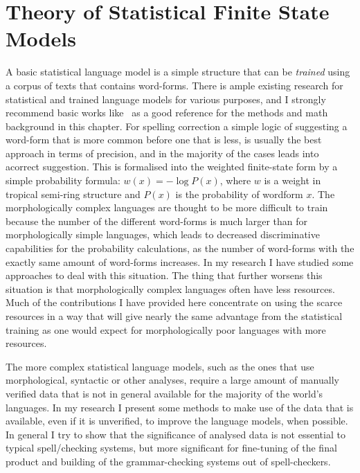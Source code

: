 \documentclass[officiallayout]{unihelcompling}
\begin{document}
\section{Theory of Statistical Finite State Models}
\label{sec:statistical}

A basic statistical language model is a simple structure that can be
\emph{trained} using a corpus of texts that contains word-forms. There is ample
existing research for statistical and trained language models for various
purposes, and I strongly recommend basic works
like~\citet{manning1999foundations} as a good reference for the methods and
math background in this chapter.  For spelling correction a simple logic of
suggesting a word-form that is more common before one that is less, is usually
the best approach in terms of precision, and in the majority of the cases leads
into acorrect suggestion. This is formalised into the weighted finite-state
form by a simple probability formula: $w(x) = -\log P(x)$, where $w$ is a
weight in tropical semi-ring structure and $P(x)$ is the probability of
wordform $x$.  The morphologically complex languages are thought to be more
difficult to train because the number of the different word-forms is much
larger than for morphologically simple languages, which leads to decreased
discriminative capabilities for the probability calculations, as the number of
word-forms with the exactly same amount of word-forms increases. In my research
I have studied some approaches to deal with this situation. The thing that
further worsens this situation is that morphologically complex languages often
have less resources.  Much of the contributions I have provided here
concentrate on using the scarce resources in a way that will give nearly the
same advantage from the statistical training as one would expect for
morphologically poor languages with more resources.

The more complex statistical language models, such as the ones that use
morphological, syntactic or other analyses, require a large amount of manually
verified data that is not in general available for the majority of the world's
languages. In my research I present some methods to make use of the data that
is available, even if it is unverified, to improve the language models, when
possible. In general I try to show that the significance of analysed data is
not essential to typical spell\-/checking systems, but more significant for
fine-tuning of the final product and building of the grammar-checking systems
out of spell-checkers.
\end{document}

